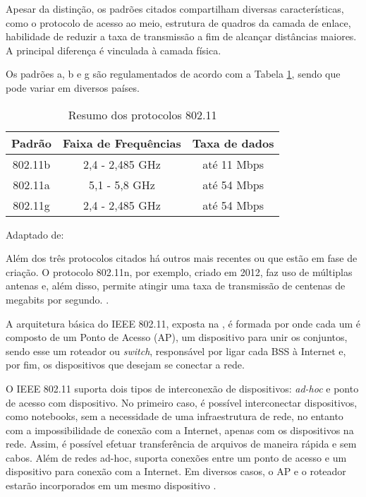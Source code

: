 Apesar da distinção, os padrões citados compartilham diversas características, como o protocolo de acesso ao meio, estrutura de quadros da camada de enlace, habilidade de reduzir a taxa de transmissão a fim de alcançar distâncias maiores. A principal diferença é vinculada à camada física.

Os padrões a, b e g são regulamentados de acordo com a Tabela \ref{tab:ieee80211abg-phy}, sendo que pode variar em diversos países.

\begin{table}[hbt]
    \caption{Resumo dos protocolos 802.11}
    \label{tab:ieee80211abg-phy}
    \centering
    \begin{tabular}{@{}ccc@{}}
        \toprule
        \textbf{Padrão} & \textbf{Faixa de Frequências} & \textbf{Taxa de dados} \\ \midrule
        802.11b         & 2,4 - 2,485 GHz               & até 11 Mbps            \\
        802.11a         & 5,1 - 5,8 GHz                 & até 54 Mbps            \\
        802.11g         & 2,4 - 2,485 GHz               & até 54 Mbps            \\ \bottomrule 
        \end{tabular}
        
    Adaptado de: 
\end{table}



Além dos três protocolos citados há outros mais recentes ou que estão em fase de criação. O protocolo 802.11n, por exemplo, criado em 2012, faz uso de múltiplas antenas e, além disso, permite atingir uma taxa de transmissão de centenas de megabits por segundo. \cite{Kurose2012}.

A arquitetura básica do IEEE 802.11, exposta na ,  é formada por  onde cada um é composto de um Ponto de Acesso (AP), um dispositivo para unir os conjuntos, sendo esse um roteador ou \textit{switch}, responsável por ligar cada BSS à Internet e, por fim, os dispositivos que desejam se conectar a rede.



O IEEE 802.11 suporta dois tipos de interconexão de dispositivos: \textit{ad-hoc} e ponto de acesso com dispositivo. No primeiro caso, é possível interconectar dispositivos, como notebooks, sem a necessidade de uma infraestrutura de rede, no entanto com a impossibilidade de conexão com a Internet, apenas com os dispositivos na rede. Assim, é possível efetuar transferência de arquivos de maneira rápida e sem cabos. Além de redes ad-hoc, suporta conexões entre um ponto de acesso e um dispositivo para conexão com a Internet. Em diversos casos, o AP e o roteador estarão incorporados em um mesmo dispositivo \cite{Kurose2012}.

